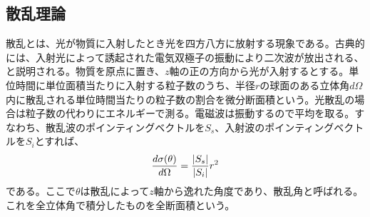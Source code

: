 \subsection{散乱理論}
    散乱とは、光が物質に入射したとき光を四方八方に放射する現象である。古典的には、入射光によって誘起された電気双極子の振動により二次波が放出される、と説明される。物質を原点に置き、$z$軸の正の方向から光が入射するとする。単位時間に単位面積当たりに入射する粒子数のうち、半径$r$の球面のある立体角$d\Omega$内に散乱される単位時間当たりの粒子数の割合を微分断面積という。光散乱の場合は粒子数の代わりにエネルギーで測る。電磁波は振動するので平均を取る。すなわち、散乱波のポインティングベクトルを$S_s$、入射波のポインティングベクトルを$S_i$とすれば、
        \[\de[\sigma(\theta)]{\Omega} = \frac{|S_s|}{|S_i|}r^2\]
    である。ここで$\theta$は散乱によって$z$軸から逸れた角度であり、散乱角と呼ばれる。これを全立体角で積分したものを全断面積という。
    
